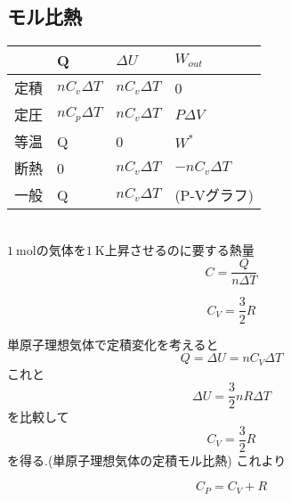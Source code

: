 \documentclass[dvipdfmx,uplatex]{jsarticle}
\begin{document}
\subsection{モル比熱}
\begin{table}[htb]
\begin{center}
	\begin{tabular}{|llll|}
		&Q	&$\Delta U$	&$W_{out}$ \\ \hline
	定積	&$nC_v \Delta T$	&$nC_v \Delta T$&0 \\
	定圧	&$nC_p \Delta T$	&$nC_v \Delta T$&$P \Delta V$\\
	等温	&Q&0&$W^*$\\
	断熱	&0&$nC_v \Delta T$ &$-nC_v \Delta T$\\
	一般	&Q&$nC_v \Delta T$&(P-Vグラフ)
	\end{tabular}
\end{center}
\end{table}
\begin{defi}[モル比熱] \mbox{} \\
$\SI{1}{\mole}$の気体を$\SI{1}{\kelvin}$上昇させるのに要する熱量
\[
C = \frac{Q}{n \Delta T} 
\]
\end{defi}
\begin{theo}[単原子理想気体の定積モル比熱]
\[
C_V = \frac{3}{2}R
\]
\end{theo}
単原子理想気体で定積変化を考えると
\[
Q = \Delta U = nC_V \Delta T
\]
これと
\[
\Delta U = \frac{3}{2}nR \Delta T
\]
を比較して
\[
C_V = \frac{3}{2} R
\]
を得る.(単原子理想気体の定積モル比熱)
これより

\begin{theo}[Mayerの関係式]
\[
C_P =C_V + R
\]
\end{theo}
\end{document}

